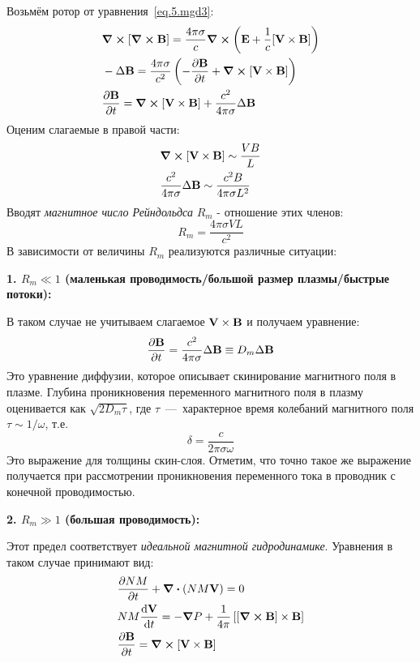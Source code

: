 \documentclass[10pt, a4paper]{article}
\numberwithin{equation}{section}
\begin{document}
Возьмём ротор от уравнения~\eqref{eq.5.mgd3}:
\begin{align*}
	&\curl{[\curl{\vb{B}}]} = \frac{4\pi\sigma}{c}\curl{\left( \vb{E} + \frac{1}{c}[\vb{V}\times\vb{B}] \right)} \\
	&-\Delta\vb{B} = \frac{4\pi\sigma}{c^2}\left( -\pdv{\vb{B}}{t} + \curl{[\vb{V}\times\vb{B}]} \right) \\
	&\pdv{\vb{B}}{t} = \curl{[\vb{V}\times\vb{B}]} + \frac{c^2}{4\pi\sigma}\Delta\vb{B}
\end{align*}
Оценим слагаемые в правой части:
\begin{align*}
	&\curl{[\vb{V}\times\vb{B}]} \sim \frac{VB}{L} \\
	&\frac{c^2}{4\pi\sigma}\Delta\vb{B} \sim \frac{c^2B}{4\pi\sigma L^2}
\end{align*}
Вводят \textit{магнитное число Рейндольдса} $R_m$ - отношение этих членов:
\begin{equation*}
	R_m = \frac{4\pi\sigma VL}{c^2}
\end{equation*}
В зависимости  от величины $R_m$ реализуются различные ситуации:

\textbf{1. $R_m \ll 1$ (маленькая проводимость/большой размер плазмы/быстрые потоки):}

В таком случае не учитываем слагаемое $\vb{V}\times\vb{B}$ и получаем уравнение:
\begin{equation}
	\pdv{\vb{B}}{t} = \frac{c^2}{4\pi\sigma}\Delta\vb{B} \equiv D_m\Delta\vb{B}
\end{equation}
Это уравнение диффузии, которое описывает скинирование магнитного поля в плазме.
Глубина проникновения переменного магнитного поля в плазму оценивается как $\sqrt{2D_m\tau}$, где $\tau$~---~характерное время колебаний магнитного поля $\tau\sim 1/\omega$, т.е.
\begin{equation*}
	\delta = \frac{c}{2\pi\sigma\omega}
\end{equation*}
Это выражение для толщины скин-слоя. Отметим, что точно такое же выражение получается при рассмотрении проникновения переменного тока в проводник с конечной проводимостью.

\textbf{2. $R_m \gg 1$ (большая проводимость):}

Этот предел соответствует \textit{идеальной магнитной гидродинамике}.
Уравнения в таком случае принимают вид:
\begin{align}
	\label{eq.5.imgd1}
	&\pdv{NM}{t} + \divergence{\left( NM\vb{V} \right)} = 0 \\
	\label{eq.5.imgd2}
	&N M \dv{\vb{V}}{t} = -\grad{P} + \frac{1}{4\pi}\left[\left[ \curl{\vb{B}} \right]\times\vb{B}\right] \\
	\label{eq.5.imgd3}
	&\pdv{\vb{B}}{t} = \curl{[\vb{V}\times\vb{B}]}
\end{align}
\end{document}
